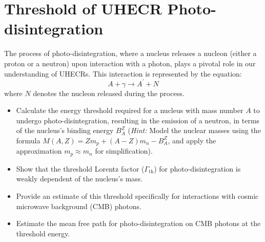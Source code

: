 \section{Threshold of UHECR Photo-disintegration}

The process of photo-disintegration, where a nucleus releases a nucleon (either a proton or a neutron) upon interaction with a photon, plays a pivotal role in our understanding of UHECRs. This interaction is represented by the equation:
%
\[A + \gamma \rightarrow A^\prime + N\]
%
where \(N\) denotes the nucleon released during the process.

\begin{itemize}
\item Calculate the energy threshold required for a nucleus with mass number \(A\) to undergo photo-disintegration, resulting in the emission of a neutron, in terms of the nucleus's binding energy \(B_A^Z\) (\emph{Hint:} Model the nuclear masses using the formula \(M(A,Z) = Z m_p + (A - Z) m_n - B_A^Z\), and apply the approximation \(m_p \approx m_n\) for simplification).
\item Show that the threshold Lorentz factor (\(\Gamma_{\text{th}}\)) for photo-disintegration is weakly dependent of the nucleus's mass. 
\item Provide an estimate of this threshold specifically for interactions with cosmic microwave background (CMB) photons.
\item Estimate the mean free path for photo-disintegration on CMB photons at the threshold energy.
\end{itemize}

